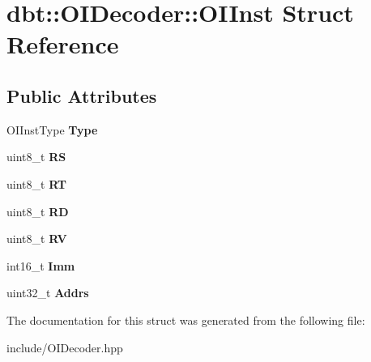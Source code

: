 \hypertarget{structdbt_1_1_o_i_decoder_1_1_o_i_inst}{}\section{dbt\+:\+:O\+I\+Decoder\+:\+:O\+I\+Inst Struct Reference}
\label{structdbt_1_1_o_i_decoder_1_1_o_i_inst}
\subsection*{Public Attributes}
\begin{DoxyCompactItemize}
\item 
O\+I\+Inst\+Type {\bfseries Type}\hypertarget{structdbt_1_1_o_i_decoder_1_1_o_i_inst_a4d79902888935cd435658b7d681646b4}{}\label{structdbt_1_1_o_i_decoder_1_1_o_i_inst_a4d79902888935cd435658b7d681646b4}

\item 
uint8\+\_\+t {\bfseries RS}\hypertarget{structdbt_1_1_o_i_decoder_1_1_o_i_inst_a6bd65a71570d28c93debb7940ad33f24}{}\label{structdbt_1_1_o_i_decoder_1_1_o_i_inst_a6bd65a71570d28c93debb7940ad33f24}

\item 
uint8\+\_\+t {\bfseries RT}\hypertarget{structdbt_1_1_o_i_decoder_1_1_o_i_inst_abcb2560c0ecacc4ba7388f53798262b5}{}\label{structdbt_1_1_o_i_decoder_1_1_o_i_inst_abcb2560c0ecacc4ba7388f53798262b5}

\item 
uint8\+\_\+t {\bfseries RD}\hypertarget{structdbt_1_1_o_i_decoder_1_1_o_i_inst_a7410a3d2c9e2fac6adb7abdd9b9f4dab}{}\label{structdbt_1_1_o_i_decoder_1_1_o_i_inst_a7410a3d2c9e2fac6adb7abdd9b9f4dab}

\item 
uint8\+\_\+t {\bfseries RV}\hypertarget{structdbt_1_1_o_i_decoder_1_1_o_i_inst_a73a5d3b23d9e287a6ff4e88ca6d443ad}{}\label{structdbt_1_1_o_i_decoder_1_1_o_i_inst_a73a5d3b23d9e287a6ff4e88ca6d443ad}

\item 
int16\+\_\+t {\bfseries Imm}\hypertarget{structdbt_1_1_o_i_decoder_1_1_o_i_inst_a6caab4638aab9412c42af6f31bddd2af}{}\label{structdbt_1_1_o_i_decoder_1_1_o_i_inst_a6caab4638aab9412c42af6f31bddd2af}

\item 
uint32\+\_\+t {\bfseries Addrs}\hypertarget{structdbt_1_1_o_i_decoder_1_1_o_i_inst_a4ab467c9b7552ad33a7746f9102e7a45}{}\label{structdbt_1_1_o_i_decoder_1_1_o_i_inst_a4ab467c9b7552ad33a7746f9102e7a45}

\end{DoxyCompactItemize}


The documentation for this struct was generated from the following file\+:\begin{DoxyCompactItemize}
\item 
include/O\+I\+Decoder.\+hpp\end{DoxyCompactItemize}
